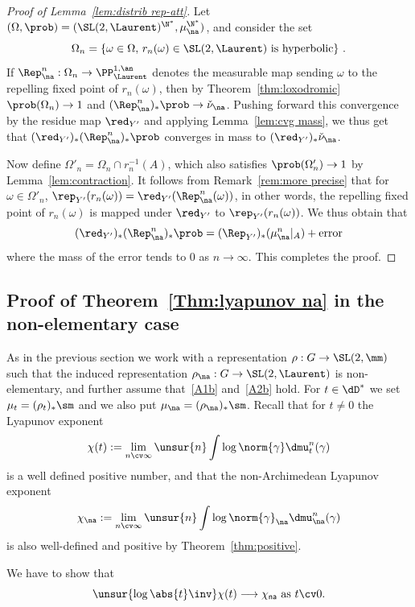 \begin{proof}[Proof of Lemma~\ref{lem:distrib rep-att}]
Let $(\Omega, \prob) = (\SL(2,\Laurent)^{\N^*}, \mu_\na^{\N^*})$, and consider the set
\[
\Omega_n = \{ \omega \in \Omega, \, r_n(\omega)\in \SL(2, \Laurent) \text{ is
hyperbolic}\}~.
\]
If $\Rep^n_\na : \Omega_n \to \PP^{1,\an}_{\Laurent}$ denotes the measurable map sending $\omega$ to the repelling fixed point of $r_n(\omega)$, then by Theorem~\ref{thm:loxodromic} $\prob(\Omega_n) \to 1$ and $(\Rep^n_\na)_* \prob \to \check{\nu}_\na$. Pushing forward this convergence by the residue map $\red_{Y'}$ and applying Lemma~\ref{lem:cvg mass}, we thus get that $(\red_{Y'})_* (\Rep^n_\na)_* \prob$ converges in mass to $(\red_{Y'})_*\check{\nu}_\na$.

Now define $\Omega'_n = \Omega_n \cap r_n^{-1}(A)$, which also satisfies $\prob(\Omega'_n) \to 1$ by Lemma~\ref{lem:contraction}. It follows from Remark~\ref{rem:more precise} that for $\omega \in \Omega'_n$, $\rep_{Y'}(r_n(\omega)) = \red_{Y'}(\Rep_\na^n (\omega))$, in other words, the repelling fixed point of $r_n(\omega)$ is mapped under $\red_{Y'}$ to $\rep_{Y'}(r_n(\omega))$. We thus obtain that
\[
(\red_{Y'})_*(\Rep^n_\na)_* \prob = (\Rep_{Y'})_*(\mu^n_\na|_{A}) + \mathrm{error}
\]
where the mass of the error tends to $0$ as $n\to\infty$. This completes the proof.
\end{proof}

\subsection{Proof of Theorem~\ref{Thm:lyapunov na} in the non-elementary case} \label{subs:asymptotics}

As in the previous section we work with a representation $\rho : G \to \SL(2, \mm)$ such that the induced representation $\rho_\na: G \to \SL(2, \Laurent)$ is non-elementary, and further assume that~\eqref{A1b} and~\eqref{A2b} hold. For $t\in \dD^*$ we set $\mu_t = (\rho_t)_* \sm$ and we also put $\mu_\na = (\rho_\na)_* \sm$. Recall that for $t\neq 0$ the Lyapunov exponent
\[
\chi(t):= \lim_{n\cv\infty} \unsur{n} \int \log\norm{\gamma} \dmu_t^n (\gamma)
\]
is a well defined positive number, and that the non-Archimedean Lyapunov exponent
\[
\chi_\na := \lim_{n\cv\infty} \unsur{n} \int \log\norm{\gamma}_\na \dmu_\na^n(\gamma)
\]
is also well-defined and positive by Theorem~\ref{thm:positive}.

We have to show that
\begin{equation}\label{eq:lyapunov na2}
\unsur{ {\log\abs{t}\inv}}\chi(t) \longrightarrow \chi_{\sf na} \text{ as } t\cv 0.
\end{equation}


